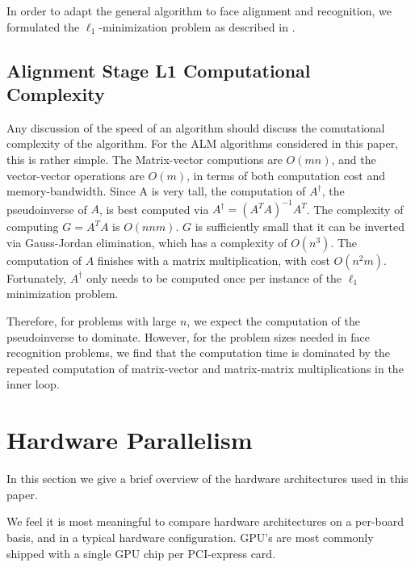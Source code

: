 \documentclass[10pt,twocolumn,letterpaper]{article}
\begin{document}


In order to adapt the general algorithm to face alignment and recognition, we formulated the 
$\ell_1$-minimization problem as described in \cite{}.

\subsection{Alignment Stage L1 Computational Complexity} Any discussion of the speed of an
algorithm should discuss the comutational complexity of the algorithm.  For the
ALM algorithms considered in this paper, this is rather simple.  The
Matrix-vector computions are $O(mn)$, and the vector-vector operations are
$O(m)$, in terms of both computation cost and memory-bandwidth.  Since A is
very tall, the computation of $A^\dagger$, the pseudoinverse of $A$, is best
computed via $A^\dagger = (A^TA)^{-1} A^T$.  The complexity of computing $G =
A^T A$ is $O(nnm)$.  $G$ is sufficiently small that it can be inverted via
Gauss-Jordan elimination, which has a complexity of $O(n^3)$.  The computation
of $A$ finishes with a matrix multiplication, with cost $O(n^2 m)$.
Fortunately, $A^\dagger$ only needs to be computed once per instance of the
$\ell_1$ minimization problem.

Therefore, for problems with large $n$, we expect the computation of the
pseudoinverse to dominate.  However, for the problem sizes needed in face
recognition problems, we find that the computation time is dominated by the
repeated computation of matrix-vector and matrix-matrix multiplications in the
inner loop.

\section{Hardware Parallelism} 
In this section we give a brief overview of the hardware architectures used
in this paper.

We feel it is most meaningful to compare hardware architectures on a per-board basis,
and in a typical hardware configuration.  GPU's are most commonly shipped with a single
GPU chip per PCI-express card.  
\end{document}
